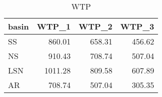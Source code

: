 \begin{table}[ht]
\centering
\begin{tabular}{lrrr}
  \hline
basin & WTP\_1 & WTP\_2 & WTP\_3 \\ 
  \hline
SS & 860.01 & 658.31 & 456.62 \\ 
  NS & 910.43 & 708.74 & 507.04 \\ 
  LSN & 1011.28 & 809.58 & 607.89 \\ 
  AR & 708.74 & 507.04 & 305.35 \\ 
   \hline
\end{tabular}
\caption{WTP} 
\end{table}
